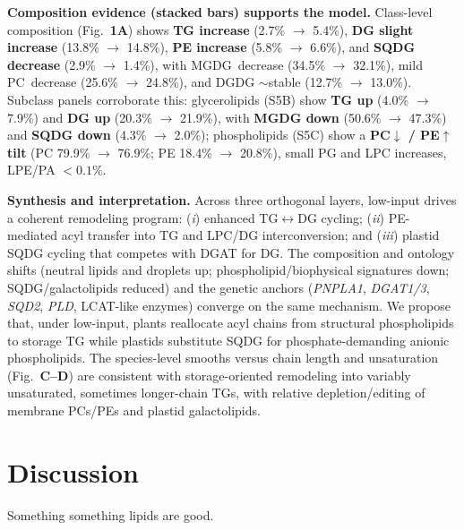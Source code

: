 \documentclass[10pt,letterpaper]{article}
\begin{document}
\noindent \textbf{Composition evidence (stacked bars) supports the model.}
Class-level composition (Fig.\ \textbf{1A}) shows \textbf{TG increase} (2.7\% $\rightarrow$ 5.4\%), \textbf{DG slight increase} (13.8\% $\rightarrow$ 14.8\%), \textbf{PE increase} (5.8\% $\rightarrow$ 6.6\%), and \textbf{SQDG decrease} (2.9\% $\rightarrow$ 1.4\%), with \mbox{MGDG decrease} (34.5\% $\rightarrow$ 32.1\%), mild \mbox{PC decrease} (25.6\% $\rightarrow$ 24.8\%), and DGDG $\sim$stable (12.7\% $\rightarrow$ 13.0\%). 
Subclass panels corroborate this: glycerolipids (S5B) show \textbf{TG up} (4.0\% $\rightarrow$ 7.9\%) and \textbf{DG up} (20.3\% $\rightarrow$ 21.9\%), with \textbf{MGDG down} (50.6\% $\rightarrow$ 47.3\%) and \textbf{SQDG down} (4.3\% $\rightarrow$ 2.0\%); phospholipids (S5C) show a \textbf{PC$\downarrow$ / PE$\uparrow$ tilt} (PC 79.9\% $\rightarrow$ 76.9\%; PE 18.4\% $\rightarrow$ 20.8\%), small PG and LPC increases, LPE/PA $<0.1\%$.

\noindent \textbf{Synthesis and interpretation.}
Across three orthogonal layers, low-input drives a coherent remodeling program: (\emph{i}) enhanced TG$\leftrightarrow$DG cycling; (\emph{ii}) PE-mediated acyl transfer into TG and LPC/DG interconversion; and (\emph{iii}) plastid SQDG cycling that competes with DGAT for DG. The composition and ontology shifts (neutral lipids and droplets up; phospholipid/biophysical signatures down; SQDG/galactolipids reduced) and the genetic anchors (\textit{PNPLA1}, \textit{DGAT1/3}, \textit{SQD2}, \textit{PLD}, LCAT-like enzymes) converge on the same mechanism. We propose that, under low-input, plants reallocate acyl chains from structural phospholipids to storage TG while plastids substitute SQDG for phosphate-demanding anionic phospholipids. The species-level smooths versus chain length and unsaturation (Fig.\ \textbf{C–D}) are consistent with storage-oriented remodeling into variably unsaturated, sometimes longer-chain TGs, with relative depletion/editing of membrane PCs/PEs and plastid galactolipids.













\section*{Discussion}
Something something lipids are good. 
\end{document}
